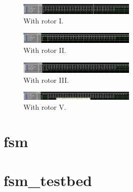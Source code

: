 \documentclass[10pt]{article}
\begin{document}
\begin{figure}[!htb]
    \centering
    \includegraphics[width=0.5\textwidth]{./perm_2.png}
    \caption{With rotor I.}
    \label{fig:perm_2}
\end{figure}
\begin{figure}[!htb]
    \centering
    \includegraphics[width=0.5\textwidth]{./perm_3.png}
    \caption{With rotor II.}
    \label{fig:perm_3}
\end{figure}
\begin{figure}[!htb]
    \centering
    \includegraphics[width=0.5\textwidth]{./perm_4.png}
    \caption{With rotor III.}
    \label{fig:perm_4}
\end{figure}
\begin{figure}[!htb]
    \centering
    \includegraphics[width=0.5\textwidth]{./perm_5.png}
    \caption{With rotor V.}
    \label{fig:perm_5}
\end{figure}

\section{fsm}

\section{fsm_testbed}
\end{document}

